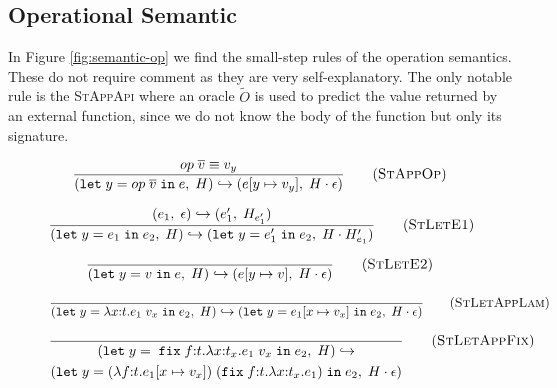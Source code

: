 \subsection{Operational Semantic}

In Figure \ref{fig:semantic-op} we find the small-step rules of the operation semantics. These do not require comment as they are very self-explanatory. The only notable rule is the \textsc{StAppApi} where an oracle $\tilde{O}$ is used to predict the value returned by an external function, since we do not know the body of the function but only its signature.

\begin{figure}[H]
    \begin{equation}
        \frac{
            op \; \overline{v} \equiv v_y
        }{
            (\texttt{let}\;y = op\;\overline{v}\;\texttt{in}\;e, \; H) \hookrightarrow (e[y \mapsto v_y], \; H \cdot \epsilon)
        }
        \tag{\textsc{StAppOp}}
        \label{eq:stappop}
    \end{equation}
    
    \begin{equation}
        \frac{
            (e_1, \;\epsilon) \hookrightarrow (e_1', \;H_{e_1'})
        }{
            (\texttt{let}\;y = e_1\;\texttt{in}\;e_2, \; H) \hookrightarrow (\texttt{let}\;y = e_1'\;\texttt{in}\;e_2, \; H \cdot H_{e_1}')
        }
        \tag{\textsc{StLetE1}}
        \label{eq:stlete1}
    \end{equation}
    
    \begin{equation}
        \frac{
            \space
        }{
            (\texttt{let}\;y = v\;\texttt{in}\;e, \; H) \hookrightarrow (e[y \mapsto v], \; H \cdot \epsilon)
        }
        \tag{\textsc{StLetE2}}
        \label{eq:stlete2}
    \end{equation}
    
    \begin{equation}
        \frac{
            \space
        }{
            (\texttt{let}\;y = \lambda x{:}t.e_1 \; v_x \;\texttt{in}\; e_2, \; H) \hookrightarrow (\texttt{let}\;y = e_1[x \mapsto v_x]\;\texttt{in}\; e_2, \; H \cdot \epsilon)
        }
        \tag{\textsc{StLetAppLam}}
        \label{eq:stletapplam}
    \end{equation}
    
    \begin{equation}
        \frac{
            \space
        }{
            \begin{gathered}
                (\texttt{let}\;y = \;\texttt{fix}\;f{:}t.\lambda x{:}t_x.e_1 \; v_x \;\texttt{in}\; e_2, \;H) \hookrightarrow \\
                (\texttt{let}\;y = (\lambda f{:}t.e_1[x \mapsto v_x])\;(\texttt{fix}\;f{:}t.\lambda x{:}t_x.e_1) \;\texttt{in}\;e_2, \;H \cdot \epsilon)
            \end{gathered}
        }
        \tag{\textsc{StLetAppFix}}
        \label{eq:stletappfix}
    \end{equation}


\end{figure}

